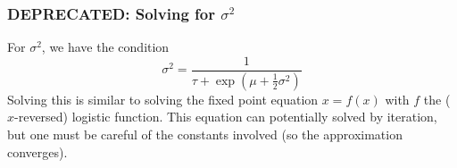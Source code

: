 \documentclass[11pt]{article}
\begin{document}
\subsubsection{DEPRECATED: Solving for $\sigma^2$}
For $\sigma^2$, we have the condition
\begin{equation}
    \sigma^2 = \frac{1}{\tau + \exp\left(\mu + \frac{1}{2}\sigma^2 \right)}
\end{equation}
Solving this is similar to solving the fixed point equation $x = f(x)$ with $f$ the ($x$-reversed) logistic function. This equation can potentially solved by iteration, but one must be careful of the constants involved (so the approximation converges).
\end{document}
